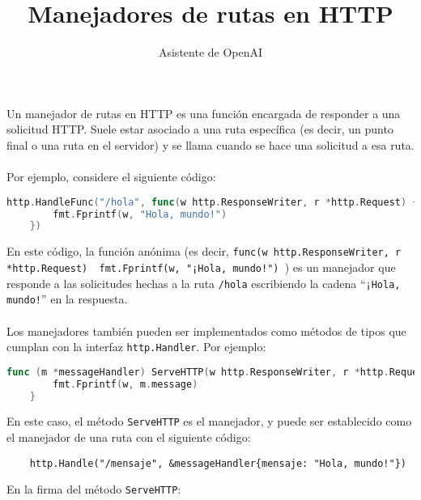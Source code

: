 \documentclass[]{article}
\title{Manejadores de rutas en HTTP}
\author{Asistente de OpenAI}
\date{}
\newcommand{\quotes}[1]{``#1''}
\begin{document}
\maketitle

Un manejador de rutas en HTTP es una función encargada de responder a una solicitud HTTP. Suele estar asociado a una ruta específica (es decir, un punto final o una ruta en el servidor) y se llama cuando se hace una solicitud a esa ruta.
\\\\
Por ejemplo, considere el siguiente código:

\begin{lstlisting}[language=Go]
	http.HandleFunc("/hola", func(w http.ResponseWriter, r *http.Request) {
		fmt.Fprintf(w, "Hola, mundo!")
	})
\end{lstlisting}

En este código, la función anónima (es decir, \texttt{func(w http.ResponseWriter, r *http.Request) { fmt.Fprintf(w, "¡Hola, mundo!") }}) es un manejador que responde a las solicitudes hechas a la ruta \texttt{/hola} escribiendo la cadena \quotes{\texttt{¡Hola, mundo!}} en la respuesta.
\\\\
Los manejadores también pueden ser implementados como métodos de tipos que cumplan con la interfaz \texttt{http.Handler}. Por ejemplo:

\begin{lstlisting}[language=Go]
	func (m *messageHandler) ServeHTTP(w http.ResponseWriter, r *http.Request) {
		fmt.Fprintf(w, m.message)
	}
\end{lstlisting}

En este caso, el método \texttt{ServeHTTP} es el manejador, y puede ser establecido como el manejador de una ruta con el siguiente código:

\begin{lstlisting}
	http.Handle("/mensaje", &messageHandler{mensaje: "Hola, mundo!"})
\end{lstlisting}

En la firma del método \texttt{ServeHTTP}:

\begin{abstract}

\end{abstract}

\section{}
\end{document}
